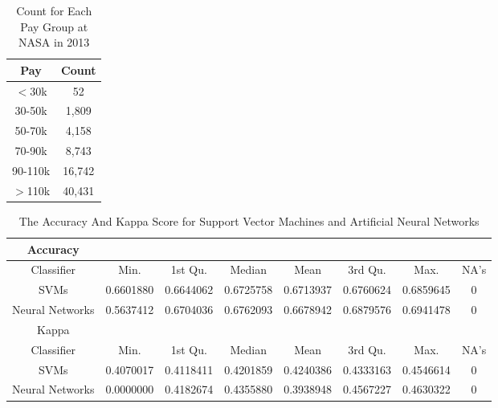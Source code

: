 \documentclass{article}
\begin{document}
    \begin{center}
        \begin{table}
            \centering
            \begin{tabular}{ |c|c| }
                \hline
                Pay & Count \\
                \hline
                $<$30k & 52 \\
                30-50k & 1,809 \\
                50-70k & 4,158 \\
                70-90k & 8,743 \\
                90-110k & 16,742 \\
                $>$110k & 40,431 \\
                \hline
            \end{tabular}
            \caption{Count for Each Pay Group at NASA in 2013}
            \label{tab:11}
        \end{table}
    \end{center}

    \begin{center}
        \begin{table}
            \centering
            \begin{tabular}{ |c|c|c|c|c|c|c|c| }
                \hline
                Accuracy \\
                \hline
                Classifier & Min. & 1st Qu. & Median & Mean & 3rd Qu. & Max. & NA's \\
                SVMs & 0.6601880 & 0.6644062 & 0.6725758 & 0.6713937 & 0.6760624 & 0.6859645 & 0 \\
                Neural Networks & 0.5637412 & 0.6704036 & 0.6762093 & 0.6678942 & 0.6879576 & 0.6941478 & 0 \\
                \hline
                Kappa \\
                \hline
                Classifier & Min. & 1st Qu. & Median & Mean & 3rd Qu. & Max. & NA's \\
                SVMs & 0.4070017 & 0.4118411 & 0.4201859 & 0.4240386 & 0.4333163 & 0.4546614 & 0 \\
                Neural Networks & 0.0000000 & 0.4182674 & 0.4355880 & 0.3938948 & 0.4567227 & 0.4630322 & 0 \\
                \hline
            \end{tabular}
            \caption{The Accuracy And Kappa Score for Support Vector Machines and Artificial Neural Networks}
            \label{tab:12}
        \end{table}
    \end{center}
\end{document}
